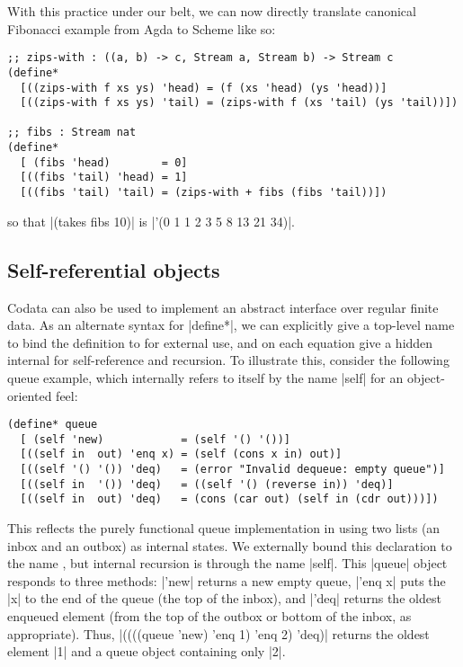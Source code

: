 


With this practice under our belt, we can now directly translate canonical Fibonacci example from Agda to Scheme like so:
\begin{verbatim}
;; zips-with : ((a, b) -> c, Stream a, Stream b) -> Stream c
(define*
  [((zips-with f xs ys) 'head) = (f (xs 'head) (ys 'head))]
  [((zips-with f xs ys) 'tail) = (zips-with f (xs 'tail) (ys 'tail))])

;; fibs : Stream nat
(define*
  [ (fibs 'head)        = 0]
  [((fibs 'tail) 'head) = 1]
  [((fibs 'tail) 'tail) = (zips-with + fibs (fibs 'tail))])
\end{verbatim}
so that \scm|(takes fibs 10)| is \scm|'(0 1 1 2 3 5 8 13 21 34)|.

\subsection{Self-referential objects}

Codata can also be used to implement an abstract interface over regular finite data.
As an alternate syntax for \scm|define*|, we can explicitly give a top-level name to bind the definition to for external use, and on each equation give a hidden internal for self-reference and recursion.
To illustrate this, consider the following queue example, which internally refers to itself by the name \scm|self| for an object-oriented feel:
\begin{verbatim}
(define* queue
  [ (self 'new)            = (self '() '())]
  [((self in  out) 'enq x) = (self (cons x in) out)]
  [((self '() '()) 'deq)   = (error "Invalid dequeue: empty queue")]
  [((self in  '()) 'deq)   = ((self '() (reverse in)) 'deq)]
  [((self in  out) 'deq)   = (cons (car out) (self in (cdr out)))])
\end{verbatim}
This reflects the purely functional queue implementation in using two lists (an inbox and an outbox) as internal states.
We externally bound this declaration to the name , but internal recursion is through the name \scm|self|.
This \scm|queue| object responds to three methods: \scm|'new| returns a new empty queue, \scm|'enq x| puts the \scm|x| to the end of the queue (\ie the top of the inbox), and \scm|'deq| returns the oldest enqueued element (from the top of the outbox or bottom of the inbox, as appropriate).
Thus, \scm|((((queue 'new) 'enq 1) 'enq 2) 'deq)| returns the oldest element \scm|1| and a queue object containing only \scm|2|.

